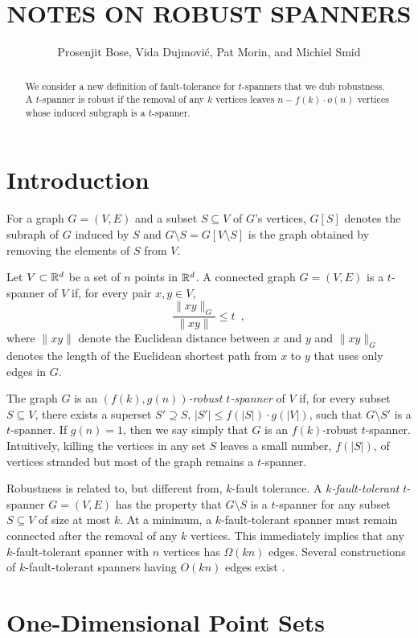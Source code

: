 \documentclass{patmorin}
\title{\MakeUppercase{Notes on Robust Spanners}}
\author{Prosenjit Bose, Vida Dujmovi\'c, Pat Morin, and Michiel Smid}
\begin{document}
\maketitle

\begin{abstract}
  We consider a new definition of fault-tolerance for $t$-spanners that
  we dub robustness.  A $t$-spanner is robust if the removal of any $k$
  vertices leaves $n-f(k)\cdot o(n)$ vertices whose induced subgraph is
  a $t$-spanner.
\end{abstract}

\section{Introduction}

For a graph $G=(V,E)$ and a subset $S\subseteq V$ of $G$'s vertices,
$G[S]$ denotes the subraph of $G$ induced by $S$ and $G\setminus
S=G[V\setminus S]$ is the graph obtained by removing the elements of $S$
from $V$.

Let $V\subset \mathbb{R}^d$ be a set of $n$ points in $\mathbb{R}^d$.  A connected graph
$G=(V,E)$ is a $t$-spanner of $V$ if, for every pair $x,y\in V$,
\[
  \frac{\|xy\|_G}{\|xy\|} \le t \enspace ,
\]
where $\|xy\|$ denote the Euclidean distance between $x$ and $y$ and
$\|xy\|_G$ denotes the length of the Euclidean shortest path from $x$
to $y$ that uses only edges in $G$.

The graph $G$ is an \emph{$(f(k),g(n))$-robust $t$-spanner} of $V$ if,
for every subset $S\subseteq V$, there exists a superset $S'\supseteq S$,
$|S'|\le f(|S|)\cdot g(|V|)$, such that $G\setminus S'$ is a $t$-spanner.
If $g(n)=1$, then we say simply that $G$ is an $f(k)$-robust $t$-spanner.
Intuitively, killing the vertices in any set $S$ leaves a small
number, $f(|S|)$, of vertices stranded but most of the graph remains
a $t$-spanner.

Robustness is related to, but different from, $k$-fault tolerance.
A \emph{$k$-fault-tolerant} $t$-spanner $G=(V,E)$ has the property that
$G\setminus S$ is a $t$-spanner for any subset $S\subseteq V$ of size
at most $k$.  At a minimum, a $k$-fault-tolerant spanner must remain
connected after the removal of any $k$ vertices.  This immediately implies
that any $k$-fault-tolerant spanner with $n$ vertices has $\Omega(kn)$
edges.  Several constructions of $k$-fault-tolerant spanners having
$O(kn)$ edges exist \cite{cz04,lns02,l99}.


\section{One-Dimensional Point Sets}
\end{document}
